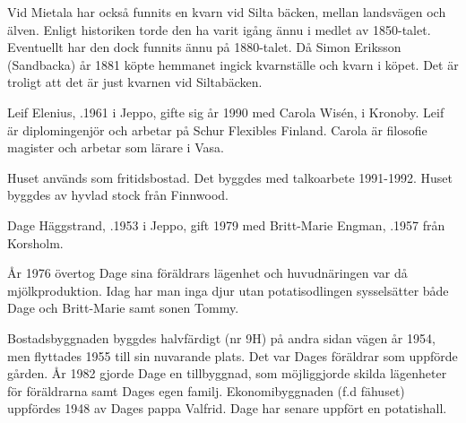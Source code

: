 
Vid Mietala har också funnits en kvarn vid Silta bäcken, mellan landsvägen och älven. Enligt historiken torde den ha varit igång ännu i medlet av 1850-talet. Eventuellt har den dock funnits ännu på 1880-talet. Då Simon Eriksson (Sandbacka) år 1881 köpte hemmanet ingick kvarnställe och kvarn  i köpet. Det är troligt att det är just kvarnen vid 		Siltabäcken.




Leif Elenius, .1961 i Jeppo, gifte sig år 1990 med Carola Wisén,  i Kronoby. Leif är diplomingenjör och arbetar på Schur Flexibles Finland. Carola är filosofie magister och arbetar som lärare i Vasa.
\begin{jhchildren}
  \item {}
  \item {}
  \item {}
\end{jhchildren}

Huset används som fritidsbostad. Det byggdes med talkoarbete 1991-1992. Huset byggdes av hyvlad stock från Finnwood.




Dage Häggstrand, .1953 i Jeppo, gift 1979 med Britt-Marie Engman, .1957 från Korsholm.
\begin{jhchildren}
  \item {}
  \item {}
\end{jhchildren}
År 1976 övertog Dage sina föräldrars lägenhet och huvudnäringen var då mjölkproduktion. Idag har man inga djur utan potatisodlingen sysselsätter både Dage och Britt-Marie samt sonen Tommy.

Bostadsbyggnaden byggdes halvfärdigt (nr 9H) på andra sidan vägen år 1954, men flyttades 1955 till sin nuvarande plats. Det var Dages föräldrar som uppförde gården. År 1982 gjorde Dage en tillbyggnad, som möjliggjorde skilda lägenheter för föräldrarna samt Dages egen familj. Ekonomibyggnaden (f.d fähuset) uppfördes 1948 av Dages pappa Valfrid. Dage har senare uppfört en potatishall.


